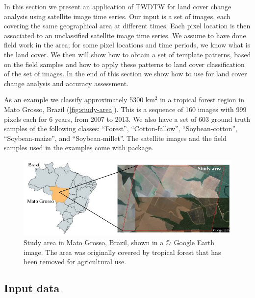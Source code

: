 \documentclass[article,shortnames]{jss}
\begin{document}
In this section we present an application of TWDTW for land cover change
analysis using satellite image time series. Our input is a set of
images, each covering the same geographical area at different times.
Each pixel location is then associated to an unclassified satellite
image time series. We assume to have done field work in the area; for
some pixel locations and time periods, we know what is the land cover.
We then will show how to obtain a set of template patterns, based on the
field samples and how to apply these patterns to land cover
classification of the set of images. In the end of this section we show
how to use  for land cover change analysis and accuracy
assessment.

As an example we classify approximately 5300 km\(^2\) in a tropical
forest region in Mato Grosso, Brazil (\autoref{fig:study-area}). This is
a sequence of 160 images with 999 pixels each for 6 years, from 2007 to
2013. We also have a set of 603 ground truth samples of the following
classes: ``Forest'', ``Cotton-fallow'', ``Soybean-cotton'',
``Soybean-maize'', and ``Soybean-millet''. The satellite images and the
field samples used in the examples come with  package.

\begin{figure}[!ht]
\begin{center} 
  \includegraphics[width=\textwidth]{study_area.pdf}
\end{center}
\caption{Study area in Mato Grosso, Brazil, shown in a \copyright\ Google Earth image. The area was originally covered by tropical forest that has been removed for agricultural use.}
\label{fig:study-area}
\end{figure}

\hypertarget{input-data-1}{%
\subsection{Input data}\label{input-data-1}}
\end{document}
